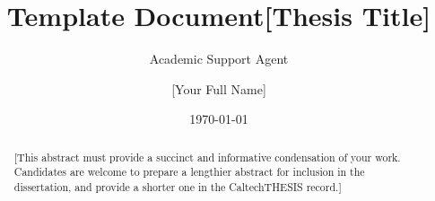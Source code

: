 \documentclass{article}
\title{Template Document}
\author{Academic Support Agent}
\date{\today}
\begin{document}
\maketitle

\title{[Thesis Title]}
\author{[Your Full Name]}

\address{Pasadena, California}                     %



\maketitle[logo]

\begin{acknowledgements} 	 
\end{acknowledgements}

\begin{abstract}
   [This abstract must provide a succinct and informative condensation of your work. Candidates are welcome to prepare a lengthier abstract for inclusion in the dissertation, and provide a shorter one in the CaltechTHESIS record.]
\end{abstract}

\begin{publishedcontent}%
\nocite{Cahn:etal:2015,Cahn:etal:2016}
\end{publishedcontent}
\end{document}
